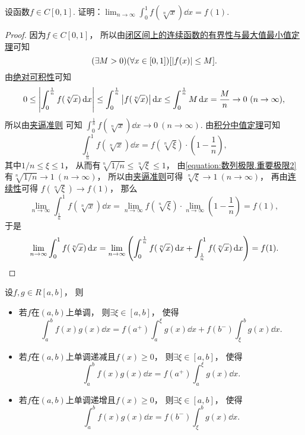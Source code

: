 \begin{example}
设函数\(f \in C[0,1]\).
证明：\(\lim_{n\to\infty} \int_0^1 f(\sqrt[n]{x}) \dd{x} = f(1)\).
\begin{proof}
因为\(f \in C[0,1]\)，
所以由\hyperref[theorem:极限.最值定理]{闭区间上的连续函数的有界性与最大值最小值定理}可知\[
	(\exists M>0)
	(\forall x\in[0,1])
	[\abs{f(x)} \leq M].
\]
由\hyperref[theorem:定积分.定积分性质5推论2]{绝对可积性}可知\[
	0 \leq \abs{\int_0^{\frac1n} f(\sqrt[n]{x}) \dd{x}}
	\leq \int_0^{\frac1n} \abs{f(\sqrt[n]{x})} \dd{x}
	\leq \int_0^{\frac1n} M \dd{x}
	= \frac{M}{n}
	\to 0\ (n\to\infty),
\]
所以由\hyperref[theorem:数列极限.夹逼准则]{夹逼准则} 可知
\(\int_0^{\frac1n} f(\sqrt[n]{x}) \dd{x} \to 0\ (n\to\infty)\).
由\hyperref[theorem:定积分.积分中值定理1推论2]{积分中值定理}可知\[
	\int_{\frac1n}^1 f(\sqrt[n]{x}) \dd{x}
	= f(\sqrt[n]{\xi}) \cdot \left( 1-\frac1n \right),
\]
其中\(1/n \leq \xi \leq 1\)，
从而有\(\sqrt[n]{1/n} \leq \sqrt[n]{\xi} \leq 1\)，
由\cref{equation:数列极限.重要极限2} 有\(\sqrt[n]{1/n} \to 1\ (n\to\infty)\)，
所以由\hyperref[theorem:数列极限.夹逼准则]{夹逼准则}可得
\(\sqrt[n]{\xi} \to 1\ (n\to\infty)\)，
再由\hyperref[theorem:极限.连续函数的极限3]{连续性}可得
\(f(\sqrt[n]{\xi}) \to f(1)\)，
那么\[
	\lim_{n\to\infty} \int_{\frac1n}^1 f(\sqrt[n]{x}) \dd{x}
	= \lim_{n\to\infty} f(\sqrt[n]{\xi})
		\cdot \lim_{n\to\infty} \left( 1-\frac1n \right)
	= f(1),
\]
于是\[
	\lim_{n\to\infty} \int_0^1 f(\sqrt[n]{x}) \dd{x}
	= \lim_{n\to\infty} \left(
		\int_0^{\frac1n} f(\sqrt[n]{x}) \dd{x}
		+ \int_{\frac1n}^1 f(\sqrt[n]{x}) \dd{x}
	\right)
	= f(1).
	\qedhere
\]
\end{proof}
\end{example}

\begin{theorem}[积分第二中值定理]\label{theorem:定积分.积分中值定理2}
设\(f,g \in R[a,b]\)，
则\begin{itemize}
	\item 若\(f\)在\((a,b)\)上单调，
	则\(\exists \xi \in [a,b]\)，
	使得\[
		\int_a^b f(x) g(x) \dd{x}
		= f(a^+) \int_a^{\xi} g(x) \dd{x} + f(b^-) \int_{\xi}^b g(x) \dd{x}.
	\]
	\item 若\(f\)在\((a,b)\)上单调递减且\(f(x) \geq 0\)，
	则\(\exists \xi \in [a,b]\)，
	使得\[
		\int_a^b f(x) g(x) \dd{x}
		= f(a^+) \int_a^{\xi} g(x) \dd{x}.
	\]
	\item 若\(f\)在\((a,b)\)上单调递增且\(f(x) \geq 0\)，
	则\(\exists \xi \in [a,b]\)，
	使得\[
		\int_a^b f(x) g(x) \dd{x}
		= f(b^-) \int_{\xi}^b g(x) \dd{x}.
	\]
\end{itemize}
\end{theorem}

